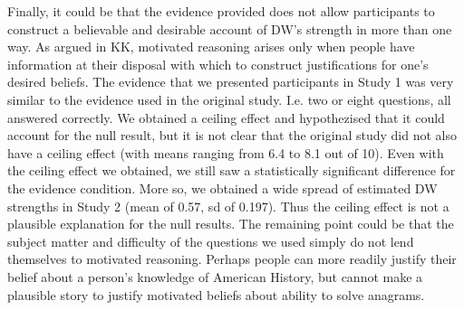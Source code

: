 \documentclass{article}
\begin{document}
Finally, it could be that the evidence provided does not allow participants to construct a believable and desirable account of DW's strength in more than one way. As argued in KK, motivated reasoning arises only when people have information at their disposal with which to construct justifications for one's desired beliefs. The evidence that we presented participants in Study 1 was very similar to the evidence used in the original study. I.e. two or eight questions, all answered correctly. We obtained a ceiling effect and hypothezised that it could account for the null result, but it is not clear that the original study did not also have a ceiling effect (with means ranging from 6.4 to 8.1 out of 10). Even with the ceiling effect we obtained, we still saw a statistically significant difference for the evidence condition. More so, we obtained a wide spread of estimated DW strengths in Study 2 (mean of 0.57, sd of 0.197). Thus the ceiling effect is not a plausible explanation for the null results. The remaining point could be that the subject matter and difficulty of the questions we used simply do not lend themselves to motivated reasoning. Perhaps people can more readily justify their belief about a person's knowledge of American History, but cannot make a plausible story to justify motivated beliefs about ability to solve anagrams. 



\setlength{\bibleftmargin}{.125in}
\setlength{\bibindent}{-\bibleftmargin}


\end{document}
